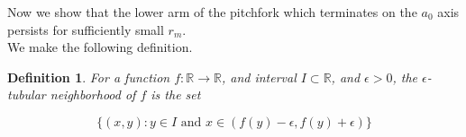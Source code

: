 \documentclass[12pt]{article}
\def\R{{\mathbb R}}
\newtheorem{definition}{Definition}
\begin{document}

Now we show that the lower arm of the pitchfork which terminates on the $a_0$ axis persists for sufficiently small $r_m$.\\

We make the following definition.

\begin{definition}
For a function $f:\R \rightarrow \R$, and interval 
$I \subset \R$, and $\epsilon > 0$, the $\epsilon$-\emph{tubular neighborhood of }$f$ is the set

\[
\{ (x, y) : y \in I \text{ and }
x \in (f(y) - \epsilon, f(y) + \epsilon) \}
\] 
\end{definition}

\end{document}
